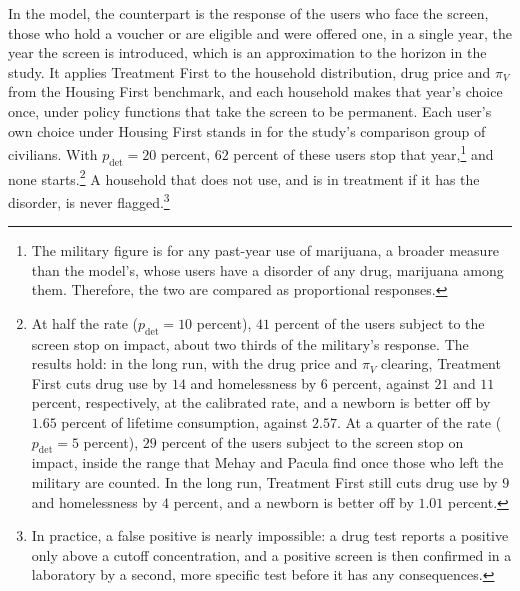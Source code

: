 \documentclass[10pt]{article}
\begin{document}
  In the model, the counterpart  is the response of  the users who face the screen, those who hold a voucher or are eligible and were offered one, in a single year, the year the screen is introduced, which is an approximation to the horizon in the study. It applies Treatment First to the household distribution, drug price and $\pi_V$ from the Housing First benchmark, and each household makes that year's choice once, under policy functions that take the screen to be permanent.  Each user's own choice under Housing First stands in for the study's comparison group of civilians.  With $p_{\mathrm{det}}=20$ percent, $62$ percent of  these users stop  that year,\footnote{The military figure is for any past-year use of marijuana, a broader measure than the model's, whose users have a disorder of any drug, marijuana among them. Therefore, the two are compared as proportional responses.} and none starts.\footnote{\label{fn:halfrate}At half the rate ($p_{\mathrm{det}}=10$ percent), $41$ percent of the users subject to the screen stop on impact, about two thirds of the military's response. The results hold: in the long run, with the drug price and $\pi_V$ clearing, Treatment First cuts drug use by $14$ and homelessness by $6$ percent, against $21$ and $11$ percent, respectively, at the calibrated rate, and a newborn is better off by $1.65$ percent of lifetime consumption, against $2.57$. At a quarter of the rate ($p_{\mathrm{det}}=5$ percent), $29$ percent of
the users subject to the screen stop on impact, inside the range that Mehay and Pacula find once those who
left the military are counted. In the long run, Treatment First still cuts drug use by $9$ and homelessness by $4$ percent, and a newborn is better off
by $1.01$ percent.} A household that does not use, and is in treatment if it has the disorder, is never flagged.\footnote{In practice, a false positive is  nearly impossible: a drug test reports a positive only above a cutoff concentration, and a positive screen is then confirmed in a laboratory by a second, more specific test before it has any consequences.}
\end{document}

